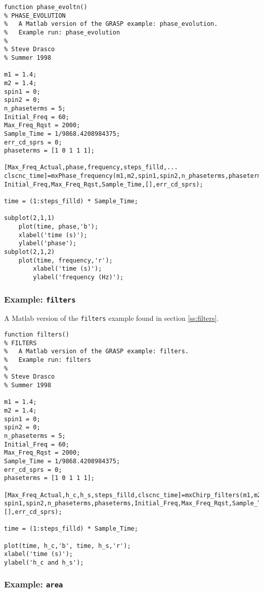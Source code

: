 \begin{verbatim}
function phase_evoltn()
% PHASE_EVOLUTION
%	A Matlab version of the GRASP example: phase_evolution.
%	Example run: phase_evolution
%
% Steve Drasco
% Summer 1998

m1 = 1.4;
m2 = 1.4;
spin1 = 0;
spin2 = 0;
n_phaseterms = 5;
Initial_Freq = 60;
Max_Freq_Rqst = 2000;
Sample_Time = 1/9868.4208984375;
err_cd_sprs = 0;
phaseterms = [1 0 1 1 1];

[Max_Freq_Actual,phase,frequency,steps_filld,...
clscnc_time]=mxPhase_frequency(m1,m2,spin1,spin2,n_phaseterms,phaseterms,...
Initial_Freq,Max_Freq_Rqst,Sample_Time,[],err_cd_sprs);

time = (1:steps_filld) * Sample_Time;

subplot(2,1,1)
	plot(time, phase,'b');
	xlabel('time (s)');
	ylabel('phase');
subplot(2,1,2)
	plot(time, frequency,'r');
        xlabel('time (s)');
        ylabel('frequency (Hz)');
\end{verbatim}

\subsubsection{Example: {\tt filters}}
\label{sss:filters}

A Matlab version of the \texttt{filters} example found in section \ref{ss:filters}.

\begin{verbatim}
function filters()
% FILTERS
%	A Matlab version of the GRASP example: filters.
%	Example run: filters
%
% Steve Drasco
% Summer 1998

m1 = 1.4;
m2 = 1.4;
spin1 = 0;
spin2 = 0;
n_phaseterms = 5;
Initial_Freq = 60;
Max_Freq_Rqst = 2000;
Sample_Time = 1/9868.4208984375;
err_cd_sprs = 0;
phaseterms = [1 0 1 1 1];

[Max_Freq_Actual,h_c,h_s,steps_filld,clscnc_time]=mxChirp_filters(m1,m2,...
spin1,spin2,n_phaseterms,phaseterms,Initial_Freq,Max_Freq_Rqst,Sample_Time,...
[],err_cd_sprs);

time = (1:steps_filld) * Sample_Time;

plot(time, h_c,'b', time, h_s,'r');
xlabel('time (s)');
ylabel('h_c and h_s');
\end{verbatim}

\subsubsection{Example: {\tt area}}
\label{sss:area}

